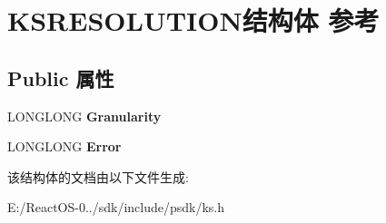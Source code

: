 \hypertarget{struct_k_s_r_e_s_o_l_u_t_i_o_n}{}\section{K\+S\+R\+E\+S\+O\+L\+U\+T\+I\+O\+N结构体 参考}
\label{struct_k_s_r_e_s_o_l_u_t_i_o_n}
\subsection*{Public 属性}
\begin{DoxyCompactItemize}
\item 
\mbox{\label{struct_k_s_r_e_s_o_l_u_t_i_o_n_a92a6f90dedb6ec2f4884d442c06e0721}} 
L\+O\+N\+G\+L\+O\+NG {\bfseries Granularity}
\item 
\mbox{\label{struct_k_s_r_e_s_o_l_u_t_i_o_n_ab085806756d6e5fef551866d83b20402}} 
L\+O\+N\+G\+L\+O\+NG {\bfseries Error}
\end{DoxyCompactItemize}


该结构体的文档由以下文件生成\+:\begin{DoxyCompactItemize}
\item 
E\+:/\+React\+O\+S-\/0../sdk/include/psdk/ks.\+h\end{DoxyCompactItemize}
